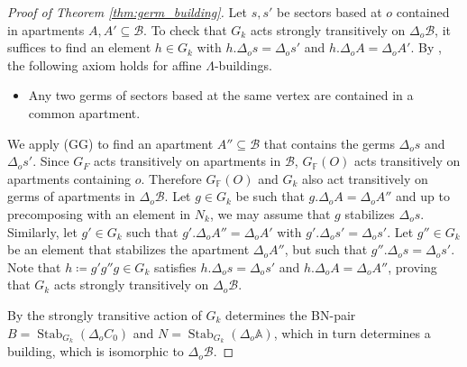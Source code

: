 \documentclass[12pt]{amsart}
\newcommand{\F}{\mathbb{F} }
\newcommand{\B}{\mathcal{B}}
\numberwithin{equation}{section}
\theoremstyle{remark} %
\begin{document}
\begin{proof}[Proof of Theorem \ref{thm:germ_building}]
	Let $s,s'$ be sectors based at $o$ contained in apartments $A,A' \subseteq \B$. To check that $G_k$ acts strongly transitively on $\Delta_o \B$, it suffices to find an element $h\in G_k$ with $h.\Delta_o s = \Delta_o s'$ and $h.\Delta_o A = \Delta_o A'$. 
	By \cite{BeScSt}, the following axiom holds for affine $\Lambda$-buildings.
	\begin{itemize}
		\item [(GG)] Any two germs of sectors based at the same vertex are contained in a common apartment.
	\end{itemize}
    We apply (GG) to find an apartment $A'' \subseteq \B$ that contains the germs $\Delta_o s$ and $\Delta_o s'$. 
    Since $G_F$ acts transitively on apartments in $\B$, $G_\F(O)$ acts transitively on apartments containing $o$. Therefore $G_\F(O)$ and $G_k$ also act transitively on germs of apartments in $\Delta_o \B$.
    Let $g \in G_k$ be such that $g.\Delta_o A = \Delta_o A''$ and up to precomposing with an element in $N_k$, we may assume that $g$ stabilizes $\Delta_o s$. Similarly, let $g'\in G_k$ such that $g'.\Delta_oA'' = \Delta_o A'$ with $g'.\Delta_o s' = \Delta_o s'$. Let $g''\in G_k$ be an element that stabilizes the apartment $\Delta_oA''$, but such that $g''.\Delta_os = \Delta_o s'$. Note that $ h \coloneq g' g'' g \in G_k$ satisfies $h.\Delta_o s = \Delta_o s'$ and $h.\Delta_o A = \Delta_o A''$, proving that $G_k$ acts strongly transitively on $\Delta_o \B$. 
    
    By \cite[(5.2), (5.3) and Remark 2]{Ron} the strongly transitive action of $G_k$ determines the BN-pair $B= \operatorname{Stab}_{G_k}(\Delta_oC_0)$ and $N=\operatorname{Stab}_{G_k}(\Delta_o \mathbb{A})$, which in turn determines a building, which is isomorphic to $\Delta_o \B$.
    

\end{proof}
\end{document}
